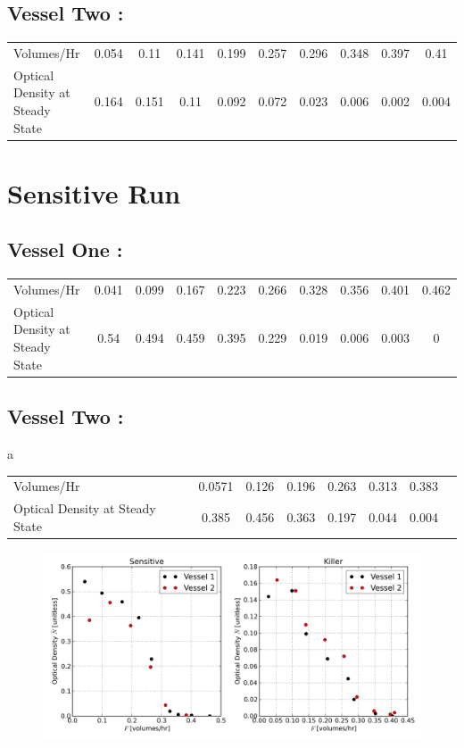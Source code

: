 \subsection*{Vessel Two :}
\begin{center}
\begin{tabular}{l|ccccccccc}
  Volumes/Hr & 0.054 & 0.11 & 0.141 & 0.199 & 0.257 & 0.296 & 0.348 & 0.397 & 0.41 \\
  Optical Density at Steady State & 0.164 & 0.151 & 0.11 & 0.092 & 0.072 & 0.023 & 0.006 & 0.002 & 0.004 \\
\end{tabular}
\end{center}

\section{Sensitive Run}
\subsection*{Vessel One :}
\begin{center}
\begin{tabular}{l|ccccccccc}
  Volumes/Hr & 0.041 & 0.099 & 0.167 & 0.223 & 0.266 & 0.328 & 0.356 & 0.401 & 0.462 \\
 Optical Density at Steady State & 0.54 & 0.494 & 0.459 & 0.395 & 0.229 & 0.019 & 0.006 & 0.003 & 0  \\
\end{tabular}
\end{center}

\subsection*{Vessel Two :}
\begin{center}
a\begin{tabular}{l|ccccccc}
 Volumes/Hr & 0.0571 & 0.126 & 0.196 & 0.263 & 0.313 & 0.383  \\
  Optical Density at Steady State & 0.385 & 0.456 & 0.363 & 0.197 & 0.044 & 0.004 \\
\end{tabular}
\end{center}

\begin{figure}[H]
  \centering
    \includegraphics[width=1.0\textwidth]{images/data.png}
\end{figure}


